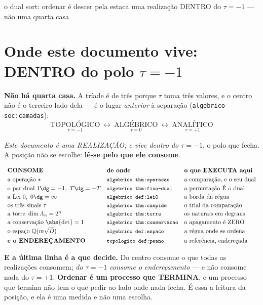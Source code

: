 \documentclass[11pt,a4paper]{article}
\newcommand{\code}[1]{\texttt{\small #1}}
\begin{document}
       {o dual sort: ordenar é descer pela estaca}
       {uma realização DENTRO do $\tau=-1$ --- não uma quarta casa}
\maketitle

\section*{Onde este documento vive: DENTRO do polo $\tau=-1$}

\noindent\textbf{Não há quarta casa.} A tríade é de três porque $\tau$ toma três valores, e
o centro não é o terceiro lado dela --- é o lugar \emph{anterior} à separação
(\code{algebrico sec:camadas}):
\[
\boxed{\;\underset{\tau=-1}{\text{TOPOLÓGICO}}\ \longleftrightarrow\
\underset{\tau=0}{\text{ALGÉBRICO}}\ \longleftrightarrow\
\underset{\tau=+1}{\text{ANALÍTICO}}\;}
\]

\noindent\emph{Este documento é uma REALIZAÇÃO, e vive dentro do $\tau=-1$}, o polo que
fecha. A posição não se escolhe: \textbf{lê-se pelo que ele consome}.

\[
\begin{array}{lll}
\textbf{CONSOME} & \textbf{de onde} & \textbf{o que EXECUTA aqui}\\[3pt]
\text{a operação }\star & \code{algebrico thm:operacao} & \text{a comparação, e o seu dual}\\[2pt]
\text{o par dual } 1\dg=-1,\ T\dg=-T & \code{algebrico thm:fixo-dual} & \text{a permutação É o dual}\\[2pt]
\text{a Lei 0},\ 0\dg=\infty & \code{algebrico def:lei0} & \text{a borda da régua}\\[2pt]
\text{os três sinais }\tau & \code{algebrico thm:cuspide} & \text{o trial da comparação}\\[2pt]
\text{a torre } \dim A_n=2^n & \code{algebrico thm:torre} & \text{os naturais em degraus}\\[2pt]
\text{a conservação }\abs{\det}=1 & \code{algebrico thm:conservacao} & \text{o apagamento é ZERO}\\[2pt]
\text{o espaço } \mathbb{Q}(m\sqrt D) & \code{algebrico def:espaco} & \text{a régua onde se ordena}\\[4pt]
\textbf{e o ENDEREÇAMENTO} & \code{topologico def:peano} & \text{a referência, endereçada}
\end{array}
\]

\noindent\textbf{E a última linha é a que decide.} Do centro consome o que todas as
realizações consomem; \emph{do $\tau=-1$ consome o endereçamento} --- e não consome nada do
$\tau=+1$. \textbf{Ordenar é um processo que TERMINA}, e um processo que termina não tem o
que pedir ao lado onde nada fecha. É essa a leitura da posição, e ela é uma medida e não
uma escolha.
\end{document}
